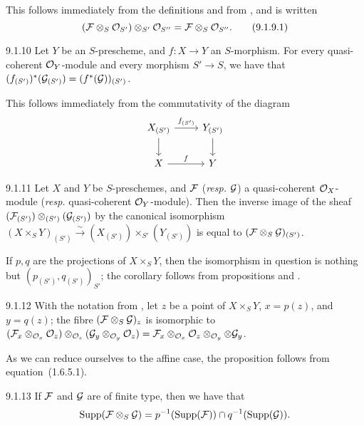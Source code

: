 \documentclass[../main.tex]{subfiles}
\begin{document}
This follows immediately from the definitions and from , and is written
\[
  (\mathcal{F}\otimes_S\mathcal{O}_{S'})\otimes_{S'}\mathcal{O}_{S''} = \mathcal{F}\otimes_S\mathcal{O}_{S''}.\tag{9.1.9.1}
\]

\begin{env}[Proposition]{9.1.10}
    Let $Y$ be an $S$-prescheme, and $f\colon X\to Y$ an $S$-morphism.
    For every quasi-coherent $\mathcal{O}_Y$-module and every morphism $S'\to S$, we have that $(f_{(S')})^\ast(\mathcal{G}_{(S')})=(f^\ast(\mathcal{G}))_{(S')}$.
\end{env}

This follows immediately from the commutativity of the diagram
\[
    \begin{tikzcd}
        X_{(S')}
            \ar{r}{f_{(S')}}
            \ar{d}
        & Y_{(S')}
            \ar{d}\\
        X
            \ar{r}{f}
        & Y
    \end{tikzcd}
\]

\begin{env}[Corollary]{9.1.11}
    Let $X$ and $Y$ be $S$-preschemes, and $\mathcal{F}$ (\emph{resp.} $\mathcal{G}$) a quasi-coherent $\mathcal{O}_X$-module (\emph{resp.} quasi-coherent $\mathcal{O}_Y$-module).
    Then the inverse image of the sheaf $(\mathcal{F}_{(S')})\otimes_{(S')}(\mathcal{G}_{(S')})$ by the canonical isomorphism $(X\times_S Y)_{(S')}\xrightarrow{\sim}(X_{(S')})\times_{S'}(Y_{(S')})$  is equal to $(\mathcal{F}\otimes_S\mathcal{G})_{(S')}$.
\end{env}

If $p,q$ are the projections of $X\times_S Y$, then the isomorphism in question is nothing but $(p_{(S')}, q_{(S')})_{S'}$; the corollary follows from propositions  and .

\begin{env}[Proposition]{9.1.12}
    With the notation from , let $z$ be a point of $X\times_S Y$, $x=p(z)$, and $y=q(z)$; the fibre $(\mathcal{F}\otimes_S\mathcal{G})_z$ is isomorphic to $(\mathcal{F}_x\otimes_{\mathcal{O}_x}\mathcal{O}_z)\otimes_{\mathcal{O}_z}(\mathcal{G}_y\otimes_{\mathcal{O}_y}\mathcal{O}_z) = \mathcal{F}_x\otimes_{\mathcal{O}_x}\mathcal{O}_z\otimes_{\mathcal{O}_y}\otimes\mathcal{G}_y$.
\end{env}

As we can reduce ourselves to the affine case, the proposition follows from equation~(1.6.5.1).

\begin{env}[Corollary]{9.1.13}
    If $\mathcal{F}$ and $\mathcal{G}$ are of finite type, then we have that
    \[
      \operatorname{Supp}(\mathcal{F}\otimes_S\mathcal{G}) = p^{-1}(\operatorname{Supp}(\mathcal{F}))\cap q^{-1}(\operatorname{Supp}(\mathcal{G})).
    \]
\end{env}
\end{document}
